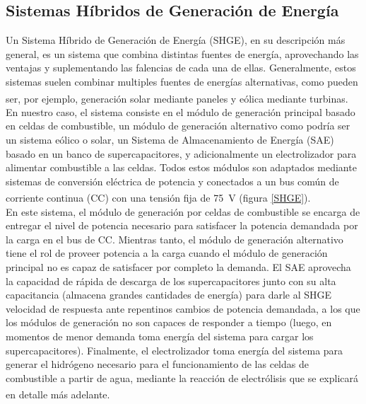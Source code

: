 \subsection{Sistemas Híbridos de Generación de Energía}

Un Sistema Híbrido de Generación de Energía (SHGE), en su descripción más general, es un sistema que combina distintas fuentes de energía, aprovechando las ventajas y suplementando las falencias de cada una de ellas. Generalmente, estos sistemas suelen combinar multiples fuentes de energías alternativas, como pueden ser, por ejemplo, generación solar mediante paneles y eólica mediante turbinas.\textsuperscript{\cite{HybridEnergySystems}}\\

En nuestro caso, el sistema consiste en el módulo de generación principal basado en celdas de combustible, un módulo de generación alternativo como podría ser un sistema eólico o solar, un Sistema de Almacenamiento de Energía (SAE) basado en un banco de supercapacitores, y adicionalmente  un electrolizador para alimentar combustible a las celdas. Todos estos módulos son adaptados mediante sistemas de conversión eléctrica de potencia y conectados a un bus común de corriente continua (CC) con una tensión fija de \SI{75}{\volt} (figura \ref{SHGE}).\textsuperscript{\cite{Talpone2012}\cite{FIAnderson2019}}\\

En este sistema, el módulo de generación por celdas de combustible se encarga de entregar el nivel de potencia necesario para satisfacer la potencia demandada por la carga en el bus de CC. Mientras tanto, el módulo de generación alternativo tiene el rol de proveer potencia a la carga cuando el módulo de generación principal no es capaz de satisfacer por completo la demanda. El SAE aprovecha la capacidad de rápida de descarga de los supercapacitores junto con su alta capacitancia (almacena grandes cantidades de energía) para darle al SHGE velocidad de respuesta ante repentinos cambios de potencia demandada, a los que los módulos de generación no son capaces de responder a tiempo (luego, en momentos de menor demanda toma energía del sistema para cargar los supercapacitores). Finalmente, el electrolizador toma energía del sistema para generar el hidrógeno necesario para el funcionamiento de las celdas de combustible a partir de agua, mediante la reacción de electrólisis que se explicará en detalle más adelante.\textsuperscript{\cite{FIAnderson2019}}\\


